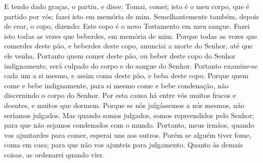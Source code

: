 {E tendo dado graças, o partiu, e disse: Tomai, comei; isto é o meu corpo, que é partido por vós; fazei isto em memória de mim.
Semelhantemente também, depois de cear,
{} o copo, dizendo: Este copo é o novo Testamento em meu sangue. Fazei isto todas as vezes que
{} beberdes, em memória de mim.
Porque todas as vezes que comerdes deste pão, e beberdes deste copo, anunciai a morte do Senhor, até que ele venha.
Portanto quem comer deste pão, ou beber deste copo do Senhor indignamente, será culpado do corpo e do sangue do Senhor.
Portanto examine-se cada um a si mesmo, e assim coma deste pão, e beba deste copo.
Porque quem come e bebe indignamente, para si mesmo come e bebe condenação, não discernindo o corpo do Senhor.
Por esta causa há entre vós muitos fracos e doentes, e muitos que dormem.
Porque se nós julgássemos a nós mesmos, não seríamos julgados.
Mas quando somos julgados, somos repreendidos pelo Senhor; para que não sejamos condenados com o mundo.
Portanto, meus irmãos, quando vos ajuntardes para comer, esperai uns aos outros.
Porém se alguém tiver fome, coma em casa; para que não vos ajunteis para
{} julgamento. Quanto às demais coisas, as ordenarei quando vier.

}
